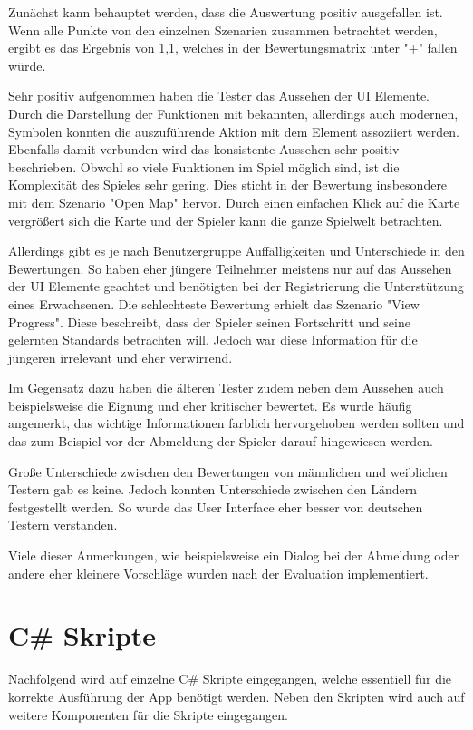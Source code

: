 				Zunächst kann behauptet werden, dass die Auswertung positiv ausgefallen ist. Wenn alle Punkte von den einzelnen Szenarien zusammen betrachtet werden, ergibt es das Ergebnis von 1,1, welches in der Bewertungsmatrix unter "+" fallen würde.

				Sehr positiv aufgenommen haben die Tester das Aussehen der UI Elemente. Durch die Darstellung der Funktionen mit bekannten, allerdings auch modernen, Symbolen konnten die auszuführende Aktion mit dem Element assoziiert werden. Ebenfalls damit verbunden wird das konsistente Aussehen sehr positiv beschrieben. Obwohl so viele Funktionen im Spiel möglich sind, ist die Komplexität des Spieles sehr gering. Dies sticht in der Bewertung insbesondere mit dem Szenario "Open Map" hervor. Durch einen einfachen Klick auf die Karte vergrößert sich die Karte und der Spieler kann die ganze Spielwelt betrachten.

				Allerdings gibt es je nach Benutzergruppe Auffälligkeiten und Unterschiede in den Bewertungen. So haben eher jüngere Teilnehmer meistens nur auf das Aussehen der UI Elemente geachtet und benötigten bei der Registrierung die Unterstützung eines Erwachsenen. Die schlechteste Bewertung erhielt das Szenario "View Progress". Diese beschreibt, dass der Spieler seinen Fortschritt und seine gelernten Standards betrachten will. Jedoch war diese Information für die jüngeren irrelevant und eher verwirrend.

				Im Gegensatz dazu haben die älteren Tester zudem neben dem Aussehen auch beispielsweise die Eignung und eher kritischer bewertet. Es wurde häufig angemerkt, das wichtige Informationen farblich hervorgehoben werden sollten und das zum Beispiel vor der Abmeldung der Spieler darauf hingewiesen werden.

				Große Unterschiede zwischen den Bewertungen von männlichen und weiblichen Testern gab es keine. Jedoch konnten Unterschiede zwischen den Ländern festgestellt werden. So wurde das User Interface eher besser von deutschen Testern verstanden.

				Viele dieser Anmerkungen, wie beispielsweise ein Dialog bei der Abmeldung oder andere eher kleinere Vorschläge wurden nach der Evaluation implementiert.

	\section{C\# Skripte}
		Nachfolgend wird auf einzelne C\# Skripte eingegangen, welche essentiell für die korrekte Ausführung der App benötigt werden. Neben den Skripten wird auch auf weitere Komponenten für die Skripte eingegangen.

